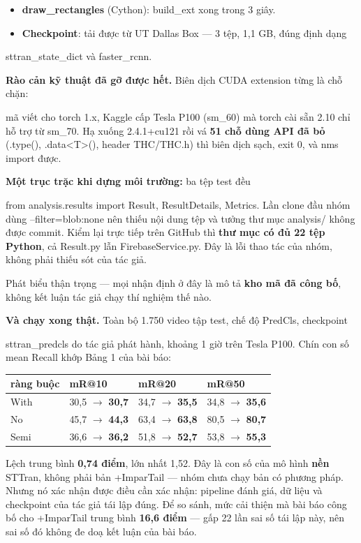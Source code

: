 \documentclass[11pt,a4paper]{article}
\newcommand{\code}[1]{{\ttfamily\small\color{codetext}#1}}
\begin{document}
\begin{itemize}\itemsep2pt
\item \textbf{\code{draw\_rectangles}} (Cython): \code{build\_ext} xong trong 3 giây.
\item \textbf{Checkpoint}: tải được từ UT Dallas Box --- 3 tệp, 1,1 GB, đúng định dạng
\end{itemize}
\code{sttran\_state\_dict} và \code{faster\_rcnn}.

\textbf{Rào cản kỹ thuật đã gỡ được hết.} Biên dịch CUDA extension từng là chỗ chặn:

mã viết cho torch 1.x, Kaggle cấp Tesla P100 (sm\_60) mà torch cài sẵn 2.10 chỉ hỗ trợ từ sm\_70. Hạ xuống 2.4.1+cu121 rồi vá \textbf{51 chỗ dùng API đã bỏ} (\code{.type()}, \code{.data<T>()}, header \code{THC/THC.h}) thì biên dịch sạch, \code{exit 0}, và \code{nms} import được.

\textbf{Một trục trặc khi dựng môi trường:} ba tệp test đều

\code{from analysis.results import Result, ResultDetails, Metrics}. Lần clone đầu nhóm dùng \code{--filter=blob:none} nên thiếu nội dung tệp và tưởng thư mục \code{analysis/} không được commit. Kiểm lại trực tiếp trên GitHub thì \textbf{thư mục có đủ 22 tệp Python}, cả \code{Result.py} lẫn \code{FirebaseService.py}. Đây là lỗi thao tác của nhóm, không phải thiếu sót của tác giả.

Phát biểu thận trọng --- mọi nhận định ở đây là mô tả \textbf{kho mã đã công bố}, không kết luận tác giả chạy thí nghiệm thế nào.

\textbf{Và chạy xong thật.} Toàn bộ 1.750 video tập test, chế độ PredCls, checkpoint

\code{sttran\_predcls} do tác giả phát hành, khoảng 1 giờ trên Tesla P100. Chín con số mean Recall khớp Bảng 1 của bài báo:

\begin{center}\small
\begin{tabular}{@{}llll@{}}
\toprule
\textbf{ràng buộc} & \textbf{mR@10} & \textbf{mR@20} & \textbf{mR@50}\\
\midrule
With & 30,5 $\rightarrow$ \textbf{30,7} & 34,7 $\rightarrow$ \textbf{35,5} & 34,8 $\rightarrow$ \textbf{35,6}\\
No & 45,7 $\rightarrow$ \textbf{44,3} & 63,4 $\rightarrow$ \textbf{63,8} & 80,5 $\rightarrow$ \textbf{80,7}\\
Semi & 36,6 $\rightarrow$ \textbf{36,2} & 51,8 $\rightarrow$ \textbf{52,7} & 53,8 $\rightarrow$ \textbf{55,3}\\
\bottomrule
\end{tabular}
\end{center}
Lệch trung bình \textbf{0,74 điểm}, lớn nhất 1,52. Đây là con số của mô hình \textbf{nền} STTran, không phải bản +ImparTail --- nhóm chưa chạy bản có phương pháp. Nhưng nó xác nhận được điều cần xác nhận: pipeline đánh giá, dữ liệu và checkpoint của tác giả tái lập đúng. Để so sánh, mức cải thiện mà bài báo công bố cho +ImparTail trung bình \textbf{16,6 điểm} --- gấp 22 lần sai số tái lập này, nên sai số đó không đe doạ kết luận của bài báo.
\end{document}
